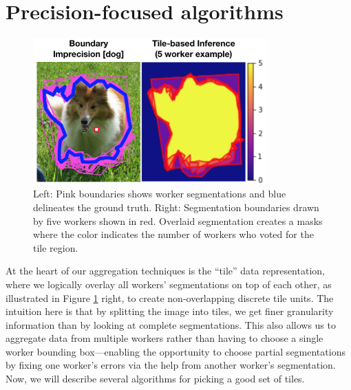 \section{Precision-focused algorithms}%
\begin{figure}[h!]
\vspace{-10pt}
\centering
\includegraphics[width=0.8\textwidth]{plots/precision_issue_tile_example.png}
\caption{Left: Pink boundaries shows worker segmentations and blue delineates the ground truth. Right: Segmentation boundaries drawn by five workers shown in red. Overlaid segmentation creates a masks where the color indicates the number of workers who voted for the tile region.}
\label{tile_demo}
\end{figure}
\vspace{-10pt}
At the heart of our aggregation techniques is the ``tile'' data representation, where we logically overlay all workers' segmentations on top of each other, as illustrated in Figure \ref{tile_demo} right, to create non-overlapping discrete tile units. The intuition here is that by splitting the image into tiles, we get finer granularity information than by looking at complete segmentations. This also allows us to aggregate data from multiple workers rather than having to choose a single worker bounding box---enabling the opportunity to choose partial segmentations by fixing one worker's errors via the help from another worker's segmentation. Now, we will describe several algorithms for picking a good set of tiles.

